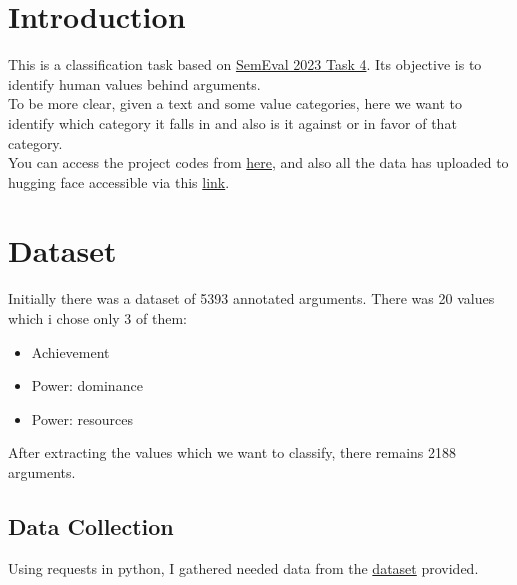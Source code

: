 
\section{Introduction}
This is a classification task based on \href{https://valueeval.webis.de/}{SemEval 2023 Task 4}. Its objective is to identify human values behind arguments.  \\
To be more clear, given a text and some value categories, here we want to identify which category it falls in and also is it against or in favor of that category.  \\
You can access the project codes from \href{https://github.com/ShahrzadAzari/Human_Value_Detection}{here},
and also all the data has uploaded to hugging face accessible via this \href{https://huggingface.co/datasets/Sheza/Human-Values}{link}. \\

\section{Dataset}
Initially there was a dataset of 5393 annotated arguments. There was 20 values which i chose only 3 of them:
\begin{itemize}
	\item Achievement
	\item Power: dominance
	\item Power: resources
\end{itemize}
After extracting the values which we want to classify, there remains 2188 arguments. \\

\subsection{Data Collection}
Using requests in python, I gathered needed data from the \href{https://zenodo.org/record/7879430/files}{dataset} provided. \\

